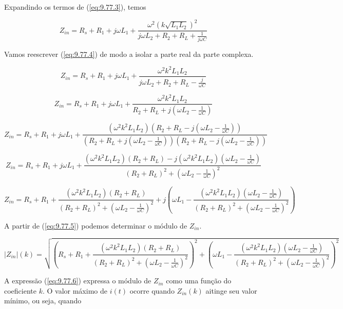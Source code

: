\documentclass[12pt]{scrartcl}
\begin{document}
    Expandindo os termos de (\ref{eq:9.77.3}), temos

    \begin{equation}\label{eq:9.77.4}
        Z_{in} = R_s + R_1 + j \omega L_1 + \frac{\omega^2(k\sqrt{L_1L_2})^2}{j\omega L_2 + R_2 + R_L + \frac{1}{j\omega C}}
    \end{equation}

    Vamos reescrever (\ref{eq:9.77.4}) de modo a isolar a parte real da parte complexa.

    \[ Z_{in} = R_s + R_1 + j \omega L_1 + \frac{\omega^2k^2L_1L_2}{j\omega L_2 + R_2 + R_L - \frac{j}{\omega C}} \]

    \[ Z_{in} = R_s + R_1 + j \omega L_1 + \frac{\omega^2k^2L_1L_2}{R_2 + R_L + j(\omega L_2 - \frac{1}{\omega C})} \]

    \[ Z_{in} = R_s + R_1 + j \omega L_1 + \frac{(\omega^2k^2L_1L_2)(R_2 + R_L - j(\omega L_2 - \frac{1}{\omega C}))}{(R_2 + R_L + j(\omega L_2 - \frac{1}{\omega C}))(R_2 + R_L - j(\omega L_2 - \frac{1}{\omega C}))} \]

    \[ Z_{in} = R_s + R_1 + j \omega L_1 + \frac{(\omega^2k^2L_1L_2)(R_2 + R_L) - j(\omega^2k^2L_1L_2)(\omega L_2 - \frac{1}{\omega C})}{(R_2 + R_L)^2 + (\omega L_2 - \frac{1}{\omega C})^2} \]

    \begin{equation}\label{eq:9.77.5}
        Z_{in} = R_s + R_1 + \frac{(\omega^2k^2L_1L_2)(R_2 + R_L)}{(R_2 + R_L)^2 + (\omega L_2 - \frac{1}{\omega C})^2} + j \left(\omega L_1 - \frac{(\omega^2k^2L_1L_2)(\omega L_2 - \frac{1}{\omega C})}{(R_2 + R_L)^2 + (\omega L_2 - \frac{1}{\omega C})^2}\right)
    \end{equation}

    A partir de (\ref{eq:9.77.5}) podemos determinar o módulo de \(Z_{in}\).

    \begin{equation}\label{eq:9.77.6}
        |Z_{in}|(k) = \sqrt{\left(R_s + R_1 + \frac{(\omega^2k^2L_1L_2)(R_2 + R_L)}{(R_2 + R_L)^2 + (\omega L_2 - \frac{1}{\omega C})^2}\right)^2 + \left(\omega L_1 - \frac{(\omega^2k^2L_1L_2)(\omega L_2 - \frac{1}{\omega C})}{(R_2 + R_L)^2 + (\omega L_2 - \frac{1}{\omega C})^2}\right)^2}
    \end{equation}

    A expressão (\ref{eq:9.77.6}) expressa o módulo de \(Z_{in}\) como uma função do coeficiente \(k\). O valor máximo de \(i(t)\) ocorre quando \(Z_{in}(k)\) aitinge seu valor mínimo, ou seja, quando
\end{document}
